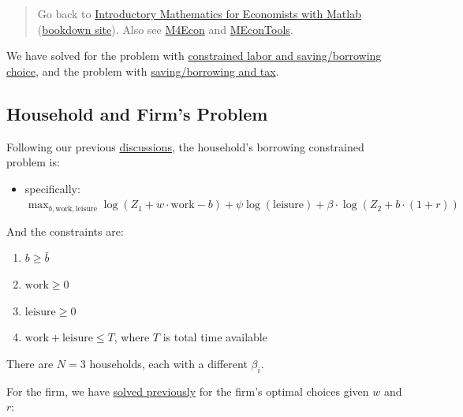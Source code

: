 \documentclass[
]{book}
\providecommand{\tightlist}{%
  \setlength{\itemsep}{0pt}\setlength{\parskip}{0pt}}
\begin{document}
\begin{quote}
Go back to \href{https://math4econ.github.io/}{Introductory Mathematics for Economists with Matlab} (\href{https://math4econ.github.io/bookdown}{bookdown site}). Also see \href{http://fanwangecon.github.io/M4Econ}{M4Econ} and \href{https://fanwangecon.github.io/MEconTools/}{MEconTools}.
\end{quote}

We have solved for the problem with \href{https://math4econ.github.io/opti_hh_constrained_brsv_inequality/household_asset_labor_constrained.html}{constrained labor and
saving/borrowing
choice},
and the problem with \href{https://math4econ.github.io/equilibrium/equilibrium_constrainedborrow.html}{saving/borrowing and
tax}.

\hypertarget{household-and-firms-problem}{%
\subsection{Household and Firm's Problem}\label{household-and-firms-problem}}

Following our previous
\href{https://math4econ.github.io/opti_hh_constrained_brsv_inequality/household_asset_labor_constrained.html}{discussions},
the household's borrowing constrained problem is:

\begin{itemize}
\tightlist
\item
  specifically:
  \(\max_{b,\textrm{work},\textrm{leisure}} \log (Z_1 +w\cdot \textrm{work}-b)+\psi \log (\textrm{leisure})+\beta \cdot \log (Z_2 +b\cdot (1+r))\)
\end{itemize}

And the constraints are:

\begin{enumerate}
\def\labelenumi{\arabic{enumi}.}
\item
  \(\displaystyle b\ge \bar{b}\)
\item
  \(\displaystyle \textrm{work}\ge 0\)
\item
  \(\displaystyle \textrm{leisure}\ge 0\)
\item
  \(\textrm{work}+\textrm{leisure}\le T\), where \(T\) is total time
  available
\end{enumerate}

There are \(N=3\) households, each with a different \(\beta_i\).

For the firm, we have \href{https://math4econ.github.io/matrix_application/KL_borrowhire_firm.html}{solved
previously}
for the firm's optimal choices given \(w\) and \(r\):
\end{document}
